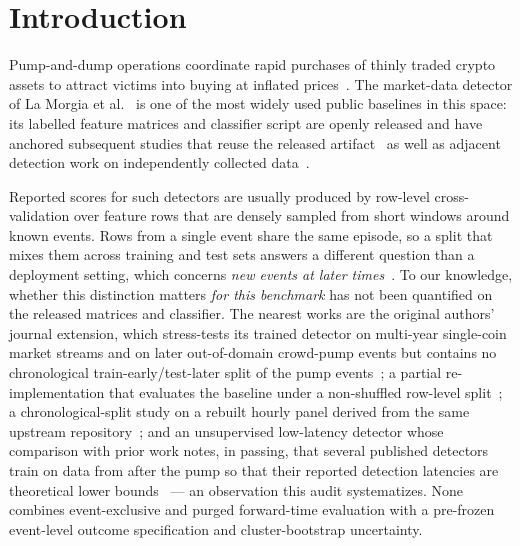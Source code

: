 \documentclass[runningheads]{llncs}
\begin{document}
\begin{abstract}
\end{abstract}

\section{Introduction}\label{sec:intro}

Pump-and-dump operations coordinate rapid purchases of thinly traded
crypto assets to attract victims into buying at inflated
prices~\cite{Kamps2018,Xu2019,Victor2019,Hamrick2021}. The market-data
detector of La Morgia et al.~\cite{LaMorgia2020} is one of the most
widely used public baselines in this space: its labelled feature
matrices and classifier script are openly released and have anchored
subsequent studies that reuse the released
artifact~\cite{Akyildirim2022,Chadalapaka2022,Moura2026,Losavio2026} as
well as adjacent detection work on independently collected
data~\cite{Nghiem2021,Hu2023}.

Reported scores for such detectors are usually produced by row-level
cross-validation over feature rows that are densely sampled from short
windows around known events. Rows from a single event share the same
episode, so a split that mixes them across training and test sets
answers a different question than a deployment setting, which concerns
\emph{new events at later times}~\cite{Kapoor2023}. To our knowledge,
whether this distinction matters \emph{for this benchmark} has not been
quantified on the released matrices and classifier. The nearest works
are the original authors' journal extension, which stress-tests its
trained detector on multi-year single-coin market streams and on later
out-of-domain crowd-pump events but contains no chronological
train-early/test-later split of the pump events~\cite{LaMorgia2023}; a
partial re-implementation that evaluates the baseline under a
non-shuffled row-level split~\cite{Chadalapaka2022}; a
chronological-split study on a rebuilt hourly panel derived from the
same upstream repository~\cite{Losavio2026}; and an unsupervised
low-latency detector whose comparison with prior work notes, in
passing, that several published detectors train on data from after the
pump so that their reported detection latencies are theoretical lower
bounds~\cite{Bello2023} --- an observation this audit systematizes.
None combines event-exclusive and purged forward-time evaluation with a
pre-frozen event-level outcome specification and cluster-bootstrap
uncertainty.
\end{document}
